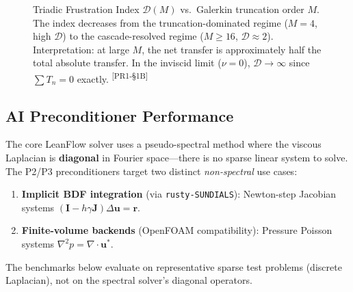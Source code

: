 \documentclass[11pt,a4paper,twoside]{article}
\newcommand{\DM}{\mathcal{D}(M)}
\newcommand{\prtag}[1]{\textsuperscript{\color{Dandelion!70!black}[PR1-\S#1]}}
\begin{document}
\begin{figure}[H]
\centering
{}
\caption{Triadic Frustration Index $\DM$ vs.\ Galerkin truncation order $M$. The index decreases from the truncation-dominated regime ($M=4$, high $\mathcal{D}$) to the cascade-resolved regime ($M \geq 16$, $\mathcal{D} \approx 2$). Interpretation: at large $M$, the net transfer is approximately half the total absolute transfer. In the inviscid limit ($\nu=0$), $\mathcal{D} \to \infty$ since $\sum T_n = 0$ exactly. \prtag{1B}}
\label{fig:frustration}
\end{figure}

\subsection{AI Preconditioner Performance}

\begin{peerreview}[title={PR1-\S3B: Scope Clarification}]
The core LeanFlow solver uses a pseudo-spectral method where the viscous Laplacian is \textbf{diagonal} in Fourier space---there is no sparse linear system to solve. The P2/P3 preconditioners target two distinct \emph{non-spectral} use cases:
\begin{enumerate}
\item \textbf{Implicit BDF integration} (via \texttt{rusty-SUNDIALS}): Newton-step Jacobian systems $(\mathbf{I} - h\gamma \mathbf{J})\Delta\mathbf{u} = \mathbf{r}$.
\item \textbf{Finite-volume backends} (OpenFOAM compatibility): Pressure Poisson systems $\nabla^2 p = \nabla \cdot \mathbf{u}^*$.
\end{enumerate}
The benchmarks below evaluate on representative sparse test problems (discrete Laplacian), not on the spectral solver's diagonal operators.
\end{peerreview}
\end{document}
